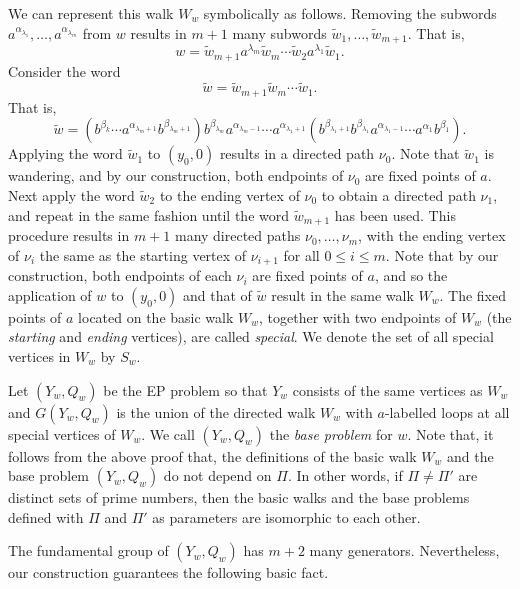 \documentclass[11pt]{amsart}
\theoremstyle{definition}
\theoremstyle{definition}
\numberwithin{equation}{section}
\begin{document}
We can represent this walk $W_w$ symbolically as follows. Removing the subwords $a^{\alpha_{\lambda_1}}, \dots, a^{\alpha_{\lambda_m}}$ from $w$ results in $m+1$ many subwords $\tilde{w}_1, \dots, \tilde{w}_{m+1}$. That is,
$$ w=\tilde{w}_{m+1}a^{\lambda_m}\tilde{w}_m\cdots \tilde{w}_2a^{\lambda_1}\tilde{w}_1. $$
Consider the word
$$ \tilde{w}=\tilde{w}_{m+1}\tilde{w}_m\cdots \tilde{w}_1. $$
That is,
\begin{equation}\label{eqn:tildew} \tilde{w}=(b^{\beta_k}\cdots a^{\alpha_{\lambda_m+1}}b^{\beta_{\lambda_m+1}})b^{\beta_{\lambda_m}}a^{\alpha_{\lambda_m-1}}\cdots a^{\alpha_{\lambda_1+1}}(b^{\beta_{\lambda_1+1}}b^{\beta_{\lambda_1}}a^{\alpha_{\lambda_1-1}}\cdots a^{\alpha_1}b^{\beta_1}). \end{equation}
Applying the word $\tilde{w}_1$ to $(y_0, 0)$ results in a directed path $\nu_0$. Note that $\tilde{w}_1$ is wandering, and by our construction, both endpoints of $\nu_0$ are fixed points of $a$. Next apply the word $\tilde{w}_2$ to the ending vertex of $\nu_0$ to obtain a directed path $\nu_1$, and repeat in the same fashion until the word $\tilde{w}_{m+1}$ has been used. This procedure results in $m+1$ many directed paths $\nu_0,\dots, \nu_{m}$, with the ending vertex of $\nu_i$ the same as the starting vertex of $\nu_{i+1}$ for all $0\leq i\leq m$. Note that by our construction, both endpoints of each $\nu_i$ are fixed points of $a$, and so the application of $w$ to $(y_0,0)$ and that of $\tilde{w}$ result in the same walk $W_w$. The fixed points of $a$ located on the basic walk $W_w$, together with two endpoints of $W_w$ (the {\em starting} and {\em ending} vertices), are called {\em special}. We denote the set of all special vertices in $W_w$ by $S_w$. 



Let $(Y_w, Q_w)$ be the EP problem so that $Y_w$ consists of the same vertices as $W_w$ and $G(Y_w, Q_w)$ is the union of the directed walk $W_w$ with $a$-labelled loops at all special vertices of $W_w$. We call $(Y_w, Q_w)$ the {\em base problem} for $w$. Note that, it follows from the above proof that, the definitions of the basic walk $W_w$ and the base problem $(Y_w, Q_w)$ do not depend on $\Pi$. In other words, if $\Pi\neq \Pi'$ are distinct sets of prime numbers, then the basic walks and the base problems defined with $\Pi$ and $\Pi'$ as parameters are isomorphic to each other. 


The fundamental group of $(Y_w, Q_w)$ has $m+2$ many generators. Nevertheless, our construction guarantees the following basic fact.
\end{document}

